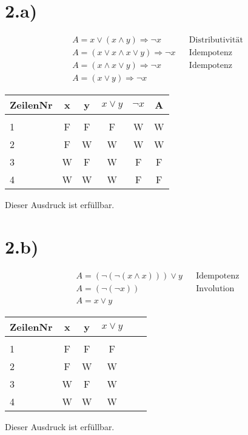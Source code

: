 \documentclass[10pt,ngerman]{scrartcl}
\begin{document}
\section{2.a)}
\begin{align}
A = x \vee (x \wedge y ) \Rightarrow \neg x && \text{Distributivität}\\
A = (x \vee x \wedge x \vee y) \Rightarrow \neg x && \text{Idempotenz} \\
A = (x \wedge x \vee y) \Rightarrow \neg x && \text{Idempotenz} \\
A = (x \vee y) \Rightarrow \neg x
\end{align}
\begin{table}[H]
\begin{center}
\begin{tabular}{l|c|c|c|c|c}
ZeilenNr & x &y & $x \vee y$ & $\neg x$ &A \\
\hline
&&&&&\\
1 & F & F & F & W & W\\
2 & F & W & W & W & W\\
3 & W & F & W & F & F\\
4 & W & W & W & F & F\\
\end{tabular}
\end{center}
\end{table}
Dieser Ausdruck ist erfüllbar.
\section{2.b)}
\setcounter{equation}{0}
\begin{align}
A =(\neg (\neg (x \wedge x))) \vee y && \text{Idempotenz} \\
A =(\neg (\neg x)) && \text{Involution} \\
A = x \vee y
\end{align}
\begin{table}[H]
\begin{center}
\begin{tabular}{l|c|c|c|c|c}
ZeilenNr & x &y & $x \vee y$\\
\hline
&&&\\
1 & F & F & F\\
2 & F & W & W\\
3 & W & F & W\\
4 & W & W & W\\
\end{tabular}
\end{center}
\end{table}
Dieser Ausdruck ist erfüllbar.
\pagebreak
\end{document}
